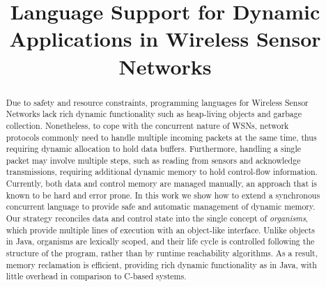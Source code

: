 \documentclass{sig-alternate-ipsn13}
\begin{document}
\title{Language Support for Dynamic Applications in Wireless Sensor Networks}

\begin{comment}
\author{
John Smith and Mary Smith}
\institute{University of North Texas\\
           Computer Science Department\\
           Denton, TX, 76203-1366\\
           john@unt.edu, mary@cs.unt.edu}
\end{comment}

\maketitle

\begin{abstract}

Due to safety and resource constraints, programming languages for Wireless 
Sensor Networks lack rich dynamic functionality such as heap-living objects and 
garbage collection.
%
Nonetheless, to cope with the concurrent nature of WSNs, network protocols 
commonly need to handle multiple incoming packets at the same time, thus 
requiring dynamic allocation to hold data buffers.
%
Furthermore, handling a single packet may involve multiple steps, such as 
reading from sensors and acknowledge transmissions, requiring additional 
dynamic memory to hold control-flow information.
%
Currently, both data and control memory are managed manually, an approach that 
is known to be hard and error prone.
%
In this work we show how to extend a synchronous concurrent language to provide 
safe and automatic management of dynamic memory.
Our strategy reconciles data and control state into the single concept of 
\emph{organisms}, which provide multiple lines of execution with an object-like 
interface.
%
Unlike objects in Java, organisms are lexically scoped, and their life cycle is 
controlled following the structure of the program, rather than by runtime 
reachability algorithms.
%
As a result, memory reclamation is efficient, providing rich dynamic 
functionality as in Java, with little overhead in comparison to C-based 
systems.

\begin{comment}
By default, references to organisms are not allowed to escape their scope, xxx 
safety.

can be optionally allocated on the stack, memory pool, or heap, depending on 
the level of flexibility required in the program.
In all cases, memory reclamation is made automatically following lexical scope, 
thus avoiding... and more efficiently than garbage collectors.

The data and control memory is then handled either by asynchronous 
communication primitives (in event-driven systems) or by predefined number of 
worker threads (in multi-threaded systems).

Dynamic behavior in applications in Wireless Sensor Networks is a reality.
Wireless Sensor Networks are
\end{comment}

\end{abstract}
\end{document}
